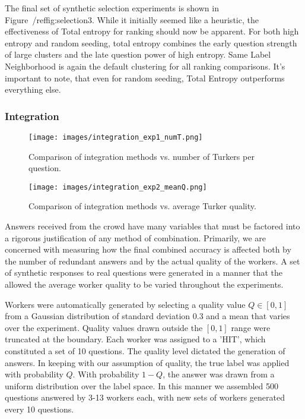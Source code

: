 The final set of synthetic selection experiments is shown in Figure~/ref{fig:selection3}.  While it initially seemed like a heuristic, the effectiveness of Total entropy for ranking should now be apparent.  For both high entropy and random seeding, total entropy combines the early question strength of large clusters and the late question power of high entropy.  Same Label Neighborhood is again the default clustering for all ranking comparisons.  It's important to note, that even for random seeding, Total Entropy outperforms everything else.



\subsubsection{Integration}
\begin{figure}
		\texttt{[image: images/integration\_exp1\_numT.png]}
		\label{fig:integrate1}
		\caption{Comparison of integration methods vs. number of Turkers per question.} 
\end{figure}
\begin{figure}
		\texttt{[image: images/integration\_exp2\_meanQ.png]}
		\label{fig:integrate2}
		\caption{Comparison of integration methods vs. average Turker quality.} 
\end{figure}

Answers received from the crowd have many variables that must be factored into a rigorous justification of any method of combination.  Primarily, we are concerned with measuring how the final combined accuracy is affected both by the number of redundant answers and by the actual quality of the workers.  A set of synthetic responses to real questions were generated in a manner that the allowed the average worker quality to be varied throughout the experiments.

Workers were automatically generated by selecting a quality value $Q \in [0,1]$ from a Gaussian distribution of standard deviation 0.3 and a mean that varies over the experiment.  Quality values drawn outside the $[0,1]$ range were truncated at the boundary.  Each worker was assigned to a 'HIT', which constituted a set of 10 questions.  The quality level dictated the generation of answers.  In keeping with our assumption of quality, the true label was applied with probability $Q$.  With probability $1-Q$, the answer was drawn from a uniform distribution over the label space.  In this manner we assembled 500 questions answered by 3-13 workers each, with new sets of workers generated every 10 questions.

